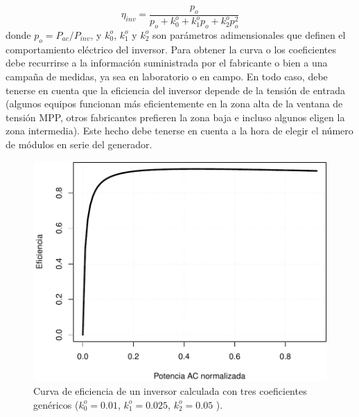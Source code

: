 \begin{equation}
\eta_{inv}=\frac{p_{o}}{p_{o}+k_{0}^{o}+k_{1}^{o}p_{o}+k_{2}^{o}p_{o}^{2}}\end{equation}
donde $p_{o}=P_{ac}/P_{inv}$,
y $k_{0}^{o}$, $k_{1}^{o}$ y $k_{2}^{o}$
son parámetros adimensionales que definen el comportamiento eléctrico
del inversor. Para obtener la curva o los coeficientes debe recurrirse
a la información suministrada por el fabricante o bien a una campaña
de medidas, ya sea en laboratorio o en campo. En todo caso, debe tenerse
en cuenta que la eficiencia del inversor depende de la tensión de
entrada \cite{Baumgartner.Schmidt.ea2007}(algunos equipos funcionan más eficientemente en la zona alta
de la ventana de tensión MPP, otros fabricantes prefieren la zona
baja e incluso algunos eligen la zona intermedia). Este hecho debe
tenerse en cuenta a la hora de elegir el número de módulos en serie
del generador.

%
\begin{figure}
\begin{centering}
\includegraphics[scale=0.75]{../figs/CurvaInversor}
\end{centering}

\caption[Curva de eficiencia de un inversor.]{Curva de eficiencia de un inversor calculada con tres coeficientes
genéricos ($k_{0}^{o}=0.01$, $k_{1}^{o}=0.025$, $k_{2}^{o}=0.05$
). \label{fig:Curva-de-eficiencia}}

\end{figure}


